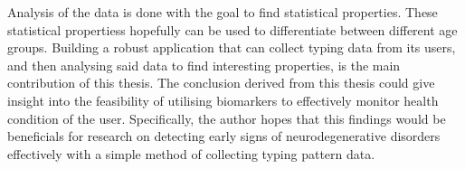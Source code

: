 Analysis of the data is done with the goal to find statistical properties.
These statistical propertiess hopefully can be used to differentiate between different age groups.
Building a robust application that can collect typing data from its users, and then analysing said data to find interesting properties, is the main contribution of this thesis. 
The conclusion derived from this thesis could give insight into the feasibility of utilising biomarkers to effectively monitor health condition of the user.
Specifically, the author hopes that this findings would be beneficials for research on detecting early signs of neurodegenerative disorders effectively with a simple method of collecting typing pattern data.